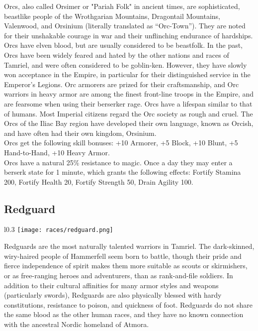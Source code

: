Orcs, also called Orsimer or "Pariah Folk" in ancient times, are sophisticated, beastlike people of the Wrothgarian Mountains, Dragontail Mountains, Valenwood, and Orsinium (literally translated as ``Orc-Town''). They are noted for their unshakable courage in war and their unflinching endurance of hardships. Orcs have elven blood, but are usually considered to be beastfolk. In the past, Orcs have been widely feared and hated by the other nations and races of Tamriel, and were often considered to be goblin-ken. However, they have slowly won acceptance in the Empire, in particular for their distinguished service in the Emperor's Legions. Orc armorers are prized for their craftsmanship, and Orc warriors in heavy armor are among the finest front-line troops in the Empire, and are fearsome when using their berserker rage. Orcs have a lifespan similar to that of humans. Most Imperial citizens regard the Orc society as rough and cruel. The Orcs of the Iliac Bay region have developed their own language, known as Orcish, and have often had their own kingdom, Orsinium.\\

Orcs get the following skill bonuses: +10 Armorer, +5 Block, +10 Blunt, +5 Hand-to-Hand, +10 Heavy Armor.\\

Orcs have a natural 25\% resistance to magic. Once a day they may enter a berserk state for 1 minute, which grants the following effects: Fortify Stamina 200, Fortify Health 20, Fortify Strength 50, Drain Agility 100.

\subsection{Redguard}
\begin{wrapfigure}{l}{0.3\textwidth}
	\texttt{[image: races/redguard.png]}
\end{wrapfigure}

Redguards are the most naturally talented warriors in Tamriel. The dark-skinned, wiry-haired people of Hammerfell seem born to battle, though their pride and fierce independence of spirit makes them more suitable as scouts or skirmishers, or as free-ranging heroes and adventurers, than as rank-and-file soldiers. In addition to their cultural affinities for many armor styles and weapons (particularly swords), Redguards are also physically blessed with hardy constitutions, resistance to poison, and quickness of foot. Redguards do not share the same blood as the other human races, and they have no known connection with the ancestral Nordic homeland of Atmora.\\

